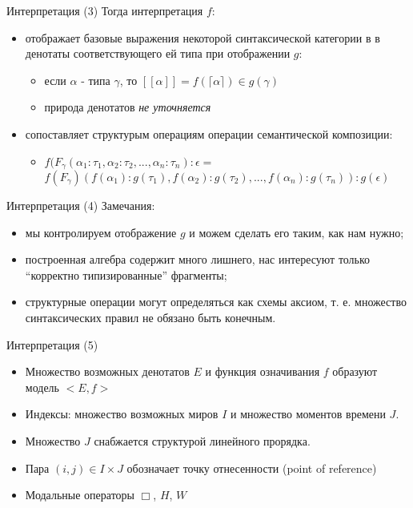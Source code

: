 \documentclass{beamer}
\begin{document}
\begin{frame}{Интерпретация (3)}
Тогда интерпретация $f$:\\
\bigskip
\begin{itemize}
  \item отображает базовые выражения некоторой синтаксической категории в в денотаты соответствующего ей типа при отображении $g$:
    \begin{itemize}
      \item если $\alpha$ - типа $\gamma$, то $[ \! [ \alpha ] \! ] = f(\lceil \alpha \rceil) \in g(\gamma)$
      \item природа денотатов \textit{не уточняется}
    \end{itemize}
  \item сопоставляет структурым операциям операции семантической композиции:
    \begin{itemize}
      \item $f(F_\gamma(\alpha_1 : \tau_1, \alpha_2 : \tau_2, ... , \alpha_n : \tau_n) : \epsilon =$\\
            $f(F_\gamma)(f(\alpha_1) : g(\tau_1), f(\alpha_2) : g(\tau_2), ... , f(\alpha_n) : g(\tau_n)) : g(\epsilon)$
    \end{itemize}
\end{itemize}
\end{frame}

\begin{frame}{Интерпретация (4)}
Замечания:\\
\bigskip
\begin{itemize}
  \item мы контролируем отображение $g$ и можем сделать его таким, как нам нужно;
  \item построенная алгебра содержит много лишнего, нас интересуют только ``корректно типизированные'' фрагменты;
  \item структурные операции могут определяться как схемы аксиом, т. е. множество синтаксических правил не обязано быть конечным.
\end{itemize}
\end{frame}

\begin{frame}{Интерпретация (5)}
\begin{itemize}
  \item Множество возможных денотатов $E$ и функция означивания $f$ образуют модель $< \! E, f \!>$
  \item Индексы: множество возможных миров $I$ и множество моментов времени $J$.
  \item Множество $J$ снабжается структурой линейного прорядка.
  \item Пара $(i, j) \in I \times J$ обозначает точку отнесенности (point of reference)
  \item Модальные операторы $\Box$, $H$, $W$
\end{itemize}
\end{frame}
\end{document}
